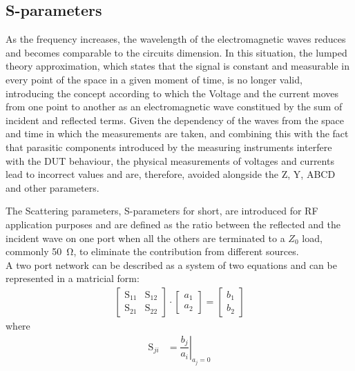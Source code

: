 \subsection{S-parameters}
As the frequency increases, the wavelength of the electromagnetic waves reduces and becomes comparable to the circuits dimension. In this situation, the lumped theory approximation, which states that the signal is constant and measurable in every point of the space in a given moment of time, is no longer valid, introducing the concept according to which the Voltage and the current moves from one point to another as an electromagnetic wave constitued by the sum of incident and reflected terms.
Given the dependency of the waves from the space and time in which the measurements are taken, and combining this with the fact that parasitic components introduced by the measuring instruments interfere with the DUT behaviour, the physical measurements of voltages and currents lead to incorrect values and are, therefore, avoided alongside the Z, Y, ABCD and other parameters.

The Scattering parameters, S-parameters for short, are introduced for RF application purposes and are defined as the ratio between the reflected and the incident wave on one port when all the others are terminated to a $Z_0$ load, commonly \SI{50}{\ohm}, to eliminate the contribution from different sources.\\
A two port network can be described as a system of two equations and can be represented in a matricial form:
\begin{align}
\begin{bmatrix}
\mathrm{S}_{11} & \mathrm{S}_{12} \\
\mathrm{S}_{21} & \mathrm{S}_{22}
\end{bmatrix}
\cdot
\begin{bmatrix}
a_1 \\
a_2
\end{bmatrix}
=
\begin{bmatrix}
b_1 \\
b_2
\end{bmatrix}
\end{align}
 where
 \begin{align}
    \mathrm{S}_{ji}&=\left. \dfrac{b_j}{a_i}\right|_{a_j=0} 
\end{align}


